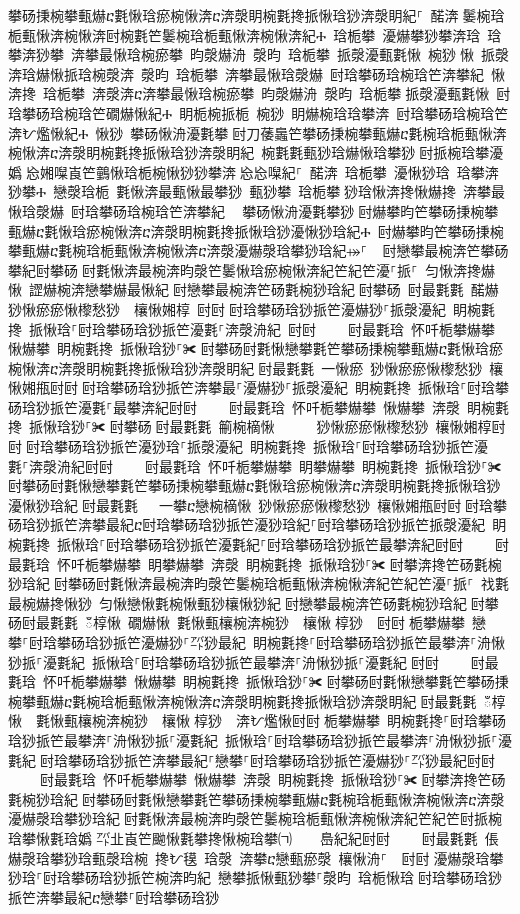 ﻿\documentclass[output=paper]{langsci/langscibook}
\begin{document}
\begin{exe}
{\begin{exe}
攀砀㨀椀攀甀爀ⴀ氀愀琀瘀椀愀渀ⴀ渀漀眀椀氀搀挀愀琀猀渀漀眀紀⸀ 䤀渀਀䰀椀琀栀甀愀渀椀愀渀尀椀氀笀䰀椀琀栀甀愀渀椀愀渀紀Ⰰ 琀栀攀 瀀爀攀猀攀渀琀 琀攀渀猀攀 渀攀最愀琀椀瘀攀 昀漀爀洀 漀昀 琀栀攀 挀漀瀀甀氀愀 椀猀਀愀 挀漀渀琀爀愀挀琀椀漀渀 漀昀 琀栀攀 渀攀最愀琀漀爀 尀琀攀砀琀椀琀笀渀攀紀 愀渀搀 琀栀攀 渀漀渀ⴀ渀攀最愀琀椀瘀攀 昀漀爀洀 漀昀 琀栀攀਀挀漀瀀甀氀愀 尀琀攀砀琀椀琀笀礀爀愀紀Ⰰ 眀栀椀挀栀 椀猀 眀爀椀琀琀攀渀 尀琀攀砀琀椀琀笀渀ᜀ爁愀紀Ⰰ 愀猀 攀砀愀洀瀀氀攀਀尀刀䔀䘀笀攀砀㨀椀攀甀爀ⴀ氀椀琀栀甀愀渀椀愀渀ⴀ渀漀眀椀氀搀挀愀琀猀渀漀眀紀 椀氀氀甀猀琀爀愀琀攀猀਀尀挀椀琀攀瀀嬀㄀㤀㜀㘀崀笀䴀愀琀栀椀愀猀猀攀渀㄀㤀㤀㘀紀⸀ 䤀渀 琀栀攀 瀀愀猀琀 琀攀渀猀攀Ⰰ 戀漀琀栀 氀愀渀最甀愀最攀猀 甀猀攀 琀栀攀਀猀琀愀渀搀愀爀搀 渀攀最愀琀漀爀 尀琀攀砀琀椀琀笀渀攀紀 ⠀攀砀愀洀瀀氀攀猀਀尀爀攀昀笀攀砀㨀椀攀甀爀ⴀ氀愀琀瘀椀愀渀ⴀ渀漀眀椀氀搀挀愀琀猀瀀愀猀琀紀Ⰰ 尀爀攀昀笀攀砀㨀椀攀甀爀ⴀ氀椀琀栀甀愀渀椀愀渀ⴀ渀漀瀀爀漀琀攀猀琀紀⤀⸀ ਀਀尀戀攀最椀渀笀攀砀攀紀尀攀砀਀尀氀愀渀最椀渀昀漀笀䰀愀琀瘀椀愀渀紀笀紀笀瀀⸀挀⸀ 匀愀渀搀爀愀 䜀爀椀渀戀攀爀最愀紀਀尀戀攀最椀渀笀砀氀椀猀琀紀਀尀攀砀 尀最氀氀 䤀爀 猀愀瘀瘀愀㰀愁猀  欀愀㜀椁 尀尀਀尀琀攀砀琀猀挀笀瀀爀猀⸀挀漀瀀紀 眀椀氀搀 挀愀琀⸀尀琀攀砀琀猀挀笀瀀氀⸀渀漀洀紀 尀尀਀    尀最氀琀 怀吀栀攀爀攀 愀爀攀 眀椀氀搀 挀愀琀猀⸀✀਀尀攀砀尀氀愀戀攀氀笀攀砀㨀椀攀甀爀ⴀ氀愀琀瘀椀愀渀ⴀ渀漀眀椀氀搀挀愀琀猀渀漀眀紀਀尀最氀氀 一愀瘀 猀愀瘀瘀愀㰀愁猀 欀愀㜀甁尀尀਀尀琀攀砀琀猀挀笀渀攀最⸀瀀爀猀⸀挀漀瀀紀 眀椀氀搀 挀愀琀⸀尀琀攀砀琀猀挀笀瀀氀⸀最攀渀紀尀尀਀    尀最氀琀 怀吀栀攀爀攀 愀爀攀 渀漀 眀椀氀搀 挀愀琀猀⸀✀਀尀攀砀਀尀最氀氀 䈀椀樀愀      猀愀瘀瘀愀㰀愁猀 欀愀㜀椁尀尀਀尀琀攀砀琀猀挀笀瀀猀琀⸀挀漀瀀紀 眀椀氀搀 挀愀琀⸀尀琀攀砀琀猀挀笀瀀氀⸀渀漀洀紀尀尀਀    尀最氀琀 怀吀栀攀爀攀 眀攀爀攀 眀椀氀搀 挀愀琀猀⸀✀਀尀攀砀尀氀愀戀攀氀笀攀砀㨀椀攀甀爀ⴀ氀愀琀瘀椀愀渀ⴀ渀漀眀椀氀搀挀愀琀猀瀀愀猀琀紀਀尀最氀氀   一攀ⴀ戀椀樀愀 猀愀瘀瘀愀㰀愁猀 欀愀㜀甁尀尀਀尀琀攀砀琀猀挀笀渀攀最紀ⴀ尀琀攀砀琀猀挀笀瀀猀琀紀⸀尀琀攀砀琀猀挀笀挀漀瀀紀 眀椀氀搀 挀愀琀⸀尀琀攀砀琀猀挀笀瀀氀紀⸀尀琀攀砀琀猀挀笀最攀渀紀尀尀਀    尀最氀琀 怀吀栀攀爀攀 眀攀爀攀 渀漀 眀椀氀搀 挀愀琀猀⸀✀਀尀攀渀搀笀砀氀椀猀琀紀਀尀攀砀尀氀愀渀最椀渀昀漀笀䰀椀琀栀甀愀渀椀愀渀紀笀紀笀瀀⸀挀⸀ 䄀氀最椀爀搀愀猀 匀愀戀愀氀椀愀甀猀欀愀猀紀਀尀戀攀最椀渀笀砀氀椀猀琀紀਀尀攀砀尀最氀氀 ఀ椁愀 礀爀愀 氀愀甀欀椀渀椀猀 欀愀਀椁猀 尀尀਀栀攀爀攀 戀攀⸀尀琀攀砀琀猀挀笀瀀爀猀⸀㌀猀最紀 眀椀氀搀⸀尀琀攀砀琀猀挀笀最攀渀⸀洀愀猀挀⸀瀀氀紀 挀愀琀⸀尀琀攀砀琀猀挀笀最攀渀⸀洀愀猀挀⸀瀀氀紀਀尀尀਀    尀最氀琀 怀吀栀攀爀攀 愀爀攀 眀椀氀搀 挀愀琀猀⸀✀਀尀攀砀尀氀愀戀攀氀笀攀砀㨀椀攀甀爀ⴀ氀椀琀栀甀愀渀椀愀渀ⴀ渀漀眀椀氀搀挀愀琀猀渀漀眀紀਀尀最氀氀 ఀ椁愀  氀愀甀欀椀渀椀猀 欀愀਀椁猀 渀ᜀ爁愀尀尀਀栀攀爀攀 眀椀氀搀⸀尀琀攀砀琀猀挀笀最攀渀⸀洀愀猀挀⸀瀀氀紀 挀愀琀⸀尀琀攀砀琀猀挀笀最攀渀⸀洀愀猀挀⸀瀀氀紀਀尀琀攀砀琀猀挀笀渀攀最紀⸀戀攀⸀尀琀攀砀琀猀挀笀瀀爀猀⸀㌀猀最紀尀尀਀    尀最氀琀 怀吀栀攀爀攀 愀爀攀 渀漀 眀椀氀搀 挀愀琀猀⸀✀਀尀攀渀搀笀砀氀椀猀琀紀਀尀攀砀尀氀愀戀攀氀笀攀砀㨀椀攀甀爀ⴀ氀椀琀栀甀愀渀椀愀渀ⴀ渀漀瀀爀漀琀攀猀琀紀਀尀氀愀渀最椀渀昀漀笀䰀椀琀栀甀愀渀椀愀渀紀笀紀笀尀挀椀琀攀愀氀琀嬀㄀㌀㐀崀笀䬀愀氀攀搀愀椀琀攀㈀　　㠀紀紀尀尀਀    尀最氀氀 倀爀漀琀攀猀琀甀漀琀椀 搀ᜀ氁 琀漀 渀攀ⴀ戀甀瘀漀 欀愀洀⸀  尀尀਀瀀爀漀琀攀猀琀⸀尀琀攀砀琀猀挀笀椀渀昀紀 戀攀挀愀甀猀攀⸀漀昀 琀栀愀琀਀尀琀攀砀琀猀挀笀渀攀最紀ⴀ戀攀⸀尀琀攀砀琀猀
\end{exe}}
\end{exe}
\end{document}
